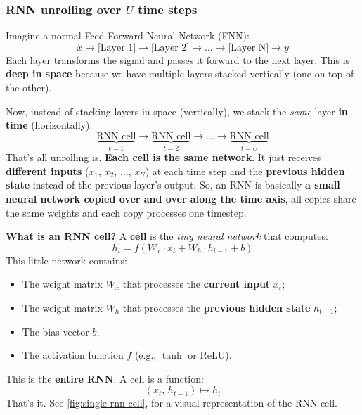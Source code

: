 \subsubsection{RNN unrolling over \texorpdfstring{$U$}{U} time steps}

Imagine a normal Feed-Forward Neural Network (FNN):
\begin{equation*}
    x \rightarrow \text{[Layer 1]} \rightarrow \text{[Layer 2]} \rightarrow \ldots \rightarrow \text{[Layer N]} \rightarrow y
\end{equation*}
Each layer transforms the signal and passes it forward to the next layer. This is \textbf{deep in space} because we have multiple layers stacked vertically (one on top of the other).

\highspace
Now, instead of stacking layers in space (vertically), we stack the \emph{same} layer \textbf{in time} (horizontally):
\begin{equation*}
    \underbrace{\text{RNN cell}}_{t=1} \rightarrow \underbrace{\text{RNN cell}}_{t=2} \rightarrow \ldots \rightarrow \underbrace{\text{RNN cell}}_{t=U}
\end{equation*}
That's all unrolling is. \textbf{Each cell is the same network}. It just receives \textbf{different inputs} ($x_1$, $x_2$, $\ldots$, $x_U$) at each time step and the \textbf{previous hidden state} instead of the previous layer's output. So, an RNN is basically \textbf{a small neural network copied over and over along the time axis}, all copies share the same weights and each copy processes one timestep.

\highspace
\textcolor{Green3}{ \textbf{What is an RNN cell?}} A \textbf{cell} is the \emph{tiny neural network} that computes:
\begin{equation*}
    h_t = f\left(W_x \cdot x_t + W_h \cdot h_{t-1} + b\right)
\end{equation*}
This little network contains:
\begin{itemize}
    \item The weight matrix $W_x$ that processes the \textbf{current input} $x_t$;
    \item The weight matrix $W_h$ that processes the \textbf{previous hidden state} $h_{t-1}$;
    \item The bias vector $b$;
    \item The activation function $f$ (e.g., $\tanh$ or ReLU).
\end{itemize}
This is the \textbf{entire RNN}. A cell is a function:
\begin{equation*}
    \left(x_t, \, h_{t-1}\right) \mapsto h_t
\end{equation*}
That's it. See \autoref{fig:single-rnn-cell},  for a visual representation of the RNN cell.

